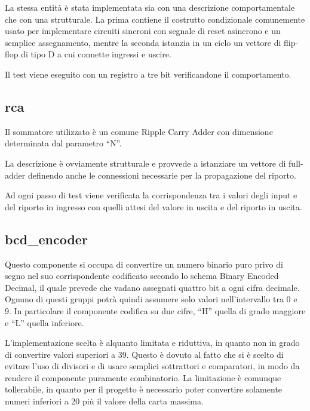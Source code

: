 \documentclass [11pt,a4paper,oneside,draft]{article}
\begin{document}


La stessa entità è stata implementata sia con una descrizione
comportamentale che con una strutturale. La prima contiene
il costrutto condizionale comunemente usato per implementare
circuiti sincroni con segnale di reset asincrono e un semplice
assegnamento, mentre la seconda istanzia in un ciclo un vettore
di flip-flop di tipo D a cui connette ingressi e uscire.



Il test viene eseguito con un registro a tre bit verificandone
il comportamento.

\subsection{rca}

Il sommatore utilizzato è un comune Ripple Carry Adder con
dimensione determinata dal parametro ``N''.



La descrizione è ovviamente strutturale e provvede a istanziare
un vettore di full-adder definendo anche le connessioni necessarie
per la propagazione del riporto.



Ad ogni passo di test viene verificata la corrispondenza tra i
valori degli input e del riporto in ingresso con quelli attesi
del valore in uscita e del riporto in uscita.

\subsection{bcd\_encoder}

Questo componente si occupa di convertire un numero binario puro privo
di segno nel suo corrispondente codificato secondo lo schema Binary
Encoded Decimal, il quale prevede che vadano assegnati quattro bit  
a ogni cifra decimale. Ognuno di questi gruppi potrà quindi assumere
solo valori nell'intervallo tra 0 e 9. In particolare il componente
codifica su due cifre, ``H'' quella di grado maggiore e ``L'' quella
inferiore.



L'implementazione scelta è alquanto limitata e riduttiva, in quanto
non in grado di convertire valori superiori a 39. Questo è dovuto al
fatto che si è scelto di evitare l'uso di divisori e di usare semplici
sottrattori e comparatori, in modo da rendere il componente puramente
combinatorio. La limitazione è comunque tollerabile, in quanto per il
progetto è necessario poter convertire solamente numeri inferiori a
20 più il valore della carta massima.
\end{document}
